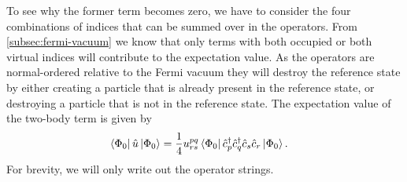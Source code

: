         To see why the former term becomes zero, we have to consider the four
        combinations of indices that can be summed over in the operators.
        From \autoref{subsec:fermi-vacuum} we know that only terms with both
        occupied or both virtual indices will contribute to the expectation
        value.
        As the operators are normal-ordered relative to the Fermi vacuum they
        will destroy the reference state by either creating a particle that is
        already present in the reference state, or destroying a particle that is
        not in the reference state.
        The expectation value of the two-body term is given by
        \begin{align}
            \bra{\Phi_{0}}\hat{u}\ket{\Phi_{0}}
            &=
            \frac{1}{4}u^{pq}_{rs}
            \bra{\Phi_{0}}\hat{c}_{p}^{\dagger}\hat{c}_{q}^{\dagger}\hat{c}_{s}\hat{c}_{r}\ket{\Phi_{0}}.
        \end{align}
        For brevity, we will only write out the operator strings.
